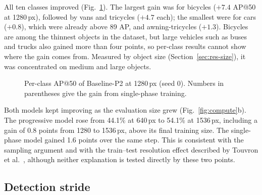 \documentclass[preprint,12pt]{elsarticle}
\begin{document}
All ten classes improved (Fig.~\ref{fig:perclass}). The largest gain was for
bicycles ($+7.4$ AP@50 at 1280\,px), followed by vans and tricycles ($+4.7$ each);
the smallest were for cars ($+0.8$), which were already above 89 AP, and
awning-tricycles ($+1.3$). Bicycles are among the thinnest objects in the dataset,
but large vehicles such as buses and trucks also gained more than four points, so
per-class results cannot show where the gain comes from. Measured by object size
(Section~\ref{sec:res-size}), it was concentrated on medium and large objects.

\begin{figure}[t]
\centering
{}
\caption{Per-class AP@50 of Baseline-P2 at 1280\,px (seed 0). Numbers in
parentheses give the gain from single-phase training.}
\label{fig:perclass}
\end{figure}

Both models kept improving as the evaluation size grew
(Fig.~\ref{fig:compute}b). The progressive model rose from 44.1\% at 640\,px to
54.1\% at 1536\,px, including a gain of 0.8 points from 1280 to 1536\,px, above its
final training size. The single-phase model gained 1.6 points over the same step.
This is consistent with the sampling argument and with the train--test resolution
effect described by Touvron et al.~\cite{touvron2019fixres}, although neither
explanation is tested directly by these two points.

\subsection{Detection stride}
\label{sec:res-stride}
\end{document}
